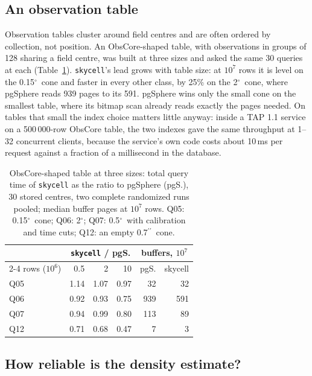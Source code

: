 \documentclass[preprint,12pt]{elsarticle}
\newcommand{\arcsec}{\ensuremath{^{\prime\prime}}}
\newcommand{\degr}{\ensuremath{^{\circ}}}
\begin{document}
\subsection{An observation table}
\label{sec:tap}

Observation tables cluster around field centres and are often ordered by collection,
not position. An ObsCore-shaped table, with observations in groups of 128 sharing a field centre, was
built at three sizes and asked the same 30 queries at each (Table~\ref{tab:crossover}).
\texttt{skycell}'s lead grows with table size: at $10^7$ rows it is level on the
0.15\degr\ cone and faster in every other class, by 25\% on the 2\degr\ cone, where
pgSphere reads 939 pages to its 591. pgSphere wins only the small cone on the smallest
table, where its bitmap scan already reads exactly the pages needed. On tables that
small the index choice matters little anyway: inside a TAP 1.1 service \citep{egernia} on
a 500\,000-row ObsCore table, the two indexes gave the same throughput at 1--32
concurrent clients, because the service's own code costs about 10\,ms per request
against a fraction of a millisecond in the database.

\begin{table}
  \caption{ObsCore-shaped table at three sizes: total query time of \texttt{skycell} as
    the ratio to pgSphere (pgS.), 30 stored centres, two complete randomized runs
    pooled; median buffer pages at $10^7$ rows. Q05: 0.15\degr\ cone; Q06: 2\degr;
    Q07: 0.5\degr\ with calibration and time cuts; Q12: an empty 0.7\arcsec\ cone.}
  \label{tab:crossover}
  \centering
  \footnotesize
  \setlength{\tabcolsep}{3pt}
  \begin{tabular}{l rrr rr}
    \hline\hline
    & \multicolumn{3}{c}{\texttt{skycell} / pgS.} & \multicolumn{2}{c}{buffers, $10^7$} \\
    \cline{2-4}\cline{5-6}
    rows ($10^6$) & 0.5 & 2 & 10 & pgS. & skycell \\
    \hline
    Q05 & 1.14 & 1.07 & 0.97 &  32 &  32 \\
    Q06 & 0.92 & 0.93 & 0.75 & 939 & 591 \\
    Q07 & 0.94 & 0.99 & 0.80 & 113 &  89 \\
    Q12 & 0.71 & 0.68 & 0.47 &   7 &   3 \\
    \hline
  \end{tabular}
\end{table}

\subsection{How reliable is the density estimate?}
\label{sec:estimator}
\label{sec:ablation}
\end{document}
